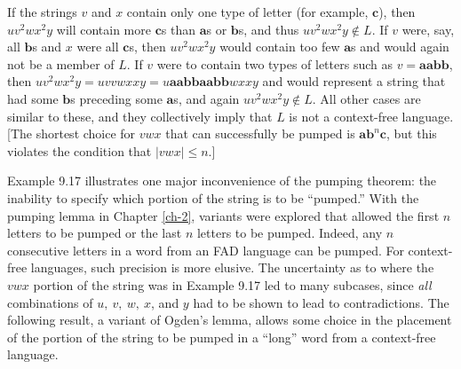 If the strings $v$ and $x$ contain only one type of letter (for example, ${\pmb
c}$), then $uv^2wx^2y$ will contain more $\pmb{c}$s than $\pmb{a}$s or $\pmb{b}$s, and
thus $uv^2wx^2y \not \in L$. If $v$ were, say, all $\pmb{b}$s and $x$ were all ${\pmb
c}$s, then $uv^2wx^2y$ would contain too few $\pmb{a}$s and would again not be a
member of $L$. If $v$ were to contain two types of letters such as $v =
\pmb{aabb}$, then $uv^2wx^2y = uvvwxxy = u\pmb{aabbaabb}wxxy$ and would
represent a string that had some $\pmb{b}$s preceding some $\pmb{a}$s, and again
$uv^2wx^2y \not \in L$. All other cases are similar to these, and they
collectively imply that $L$ is not a context-free language.
[The shortest choice for $vwx$ that can successfully be pumped is
$\pmb{ab}^n\pmb{c}$, but this violates the condition that $|vwx| \leq n$.]

Example 9.17 illustrates one major inconvenience of the pumping theorem: the
inability to specify which portion of the string is to be ``pumped.'' With the
pumping lemma in Chapter \ref{ch-2}, variants were explored that allowed the first $n$
letters to be pumped or the last $n$ letters to be pumped. Indeed, any $n$
consecutive letters in a word from an FAD language can be pumped. For
context-free languages, such precision is more elusive. The uncertainty as to
where the $vwx$ portion of the string was in Example 9.17 led to many subcases,
since \emph{all} combinations of $u,\ v,\ w,\ x$, and $y$ had to be shown to lead to
contradictions. The following result, a variant of Ogden's lemma, allows some
choice in the placement of the portion of the string to be pumped in a ``long''
word from a context-free language.

